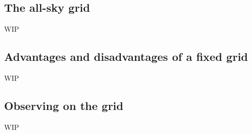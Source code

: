 \begin{colsection}
\begin{colsection}
\end{colsection}


\subsection{The all-sky grid}
\label{sec:survey}
\begin{colsection}

WIP

\end{colsection}


\subsection{Advantages and disadvantages of a fixed grid}
\label{sec:fixed_grid}
\begin{colsection}

WIP

\end{colsection}


\subsection{Observing on the grid}
\label{sec:grid_observing}
\begin{colsection}

WIP

\end{colsection}


\end{colsection}


\newpage
